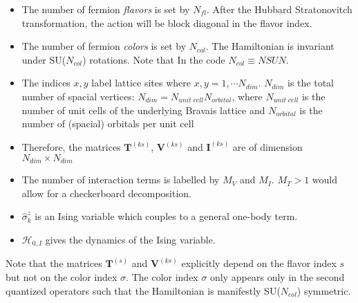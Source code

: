 \begin{itemize}
\item The number of fermion \textit{flavors} is set by $N_{fl}$.  After the Hubbard Stratonovitch transformation, the action will be block diagonal in the flavor index. 
\item The number of fermion \textit{colors} is set by $N_{col}$.    The Hamiltonian is invariant under  SU($N_{col}$)  rotations. Note that  In the code $ N_{col} \equiv NSUN $. 
\item The indices $x,y$ label lattice sites where $x,y=1,\cdots N_{dim}$. 
$N_{dim}$ is the total number of spacial vertices: $N_{dim}=N_{unit\;cell} N_{orbital}$, where $N_{unit\;cell}$ is the number of unit cells of the underlying Bravais lattice and $N_{orbital}$ is the number of (spacial) orbitals per unit cell  
\item Therefore, the  matrices $\bm{T}^{(k s)}$, $\bm{V}^{(ks)}$  and $\bm{I}^{(ks)}$ are  of dimension $N_{dim}\times N_{dim}$
\item The number of interaction terms  is labelled by $M_V$   and $M_I$.   $M_T> 1 $ would allow for a checkerboard decomposition. 
\item $\hat{\sigma}^z_k$ is an Ising variable which couples to a general one-body term. 
\item  $\mathcal{H}_{0,I}$  gives the dynamics of the Ising variable. 
\end{itemize}
Note that the matrices  $\bm{T}^{(s)}$ and $\bm{V}^{(ks)}$ explicitly depend on the flavor index $s$ but not on the color index $\sigma$. 
The color index $\sigma$ only appears only in  the  second quantized operators such that the Hamiltonian is manifestly SU($N_{col}$)    symmetric.


